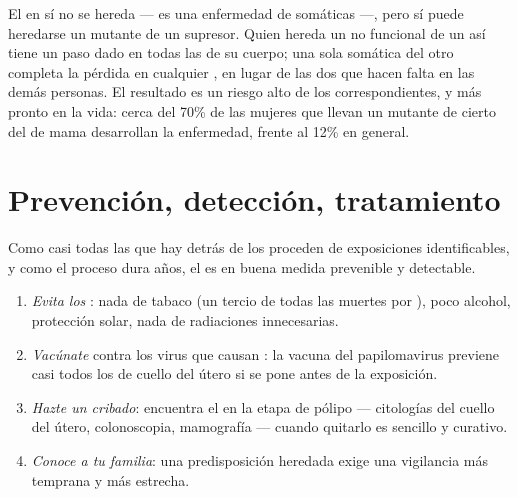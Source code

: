 \begin{proposition}\label{prop:g11:cancer:inherited}
El  en sí no se hereda --- es una enfermedad de 
somáticas ---, pero sí puede heredarse un  mutante de un 
supresor. Quien hereda un  no funcional de un  así tiene un
paso dado en todas las  de su cuerpo; una sola  somática
del otro  completa la pérdida en cualquier , en lugar de las
dos que hacen falta en las demás personas. El resultado es un riesgo
alto de los  correspondientes, y más pronto en la vida: cerca
del 70\% de las mujeres que llevan un  mutante de cierto  del
 de mama desarrollan la enfermedad, frente al 12\% en general.
\end{proposition}
\admitted

\section{Prevención, detección, tratamiento}

\begin{method}\label{met:g11:cancer:prevention}
Como casi todas las  que hay detrás de los  proceden
de exposiciones identificables, y como el proceso dura años, el 
es en buena medida prevenible y detectable.
\begin{enumerate}
  \item \emph{Evita los }: nada de tabaco (un tercio de todas
        las muertes por ), poco alcohol, protección solar, nada
        de radiaciones innecesarias.
  \item \emph{Vacúnate} contra los virus que causan : la vacuna
        del papilomavirus previene casi todos los  de cuello
        del útero si se pone antes de la exposición.
  \item \emph{Hazte un cribado}: encuentra el  en la etapa de
        pólipo --- citologías del cuello del útero, colonoscopia,
        mamografía --- cuando quitarlo es sencillo y curativo.
  \item \emph{Conoce a tu familia}: una predisposición heredada exige
        una vigilancia más temprana y más estrecha.
\end{enumerate}
\end{method}

